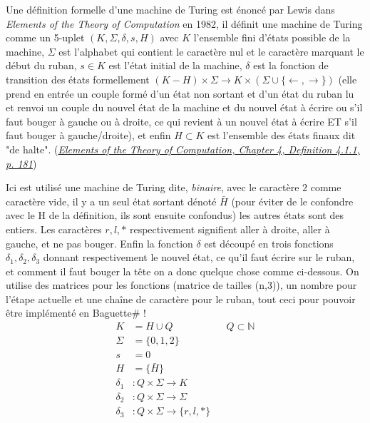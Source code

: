 \documentclass[11pt,colorlinks=true,a4paper]{article}
\newcommand{\bsf}{Baguette\# }
\begin{document}
        Une définition formelle d'une machine de Turing est énoncé par Lewis dans \textit{Elements of the Theory of Computation} en 1982, il définit une machine de Turing 
        comme un 5-uplet $(K,\Sigma,\delta,s,H)$ avec $K$ l'ensemble fini d'états possible de la machine, $\Sigma$ est l'alphabet qui contient 
        le caractère nul et le caractère marquant le début du ruban, $s \in K$ est l'état initial de la machine, $\delta$ est la fonction 
        de transition des états formellement $(K - H) \times \Sigma \to K \times (\Sigma \cup \{\leftarrow,\rightarrow\})$
        (elle prend en entrée un couple formé d'un état non sortant et d'un état du ruban lu et 
        renvoi un couple du nouvel état de la machine et du nouvel état à écrire ou s'il faut bouger à gauche ou à droite, ce qui 
        revient à un nouvel état à écrire ET s'il faut bouger à gauche/droite), et enfin $H \subset K$ est l'ensemble des états 
        finaux dit "de halte". (\href{https://www.awa2el.net/sites/default/files/nzry_hsbt_ltb_lthny.pdf}{\textit{Elements of the Theory of Computation, Chapter 4, Definition 4.1.1, p. 181}})\newline

        
        Ici est utilisé une machine de Turing dite, \textit{binaire}, avec le caractère $2$ comme caractère vide, 
        il y a un seul état sortant dénoté $\bar{H}$ (pour éviter de le confondre avec le H de la définition, ils sont ensuite confondus) 
        les autres états sont des entiers. 
        Les caractères $r,l,*$ respectivement signifient aller à droite, aller à gauche, et ne pas bouger.
        Enfin la fonction $\delta$ est découpé en trois fonctions $\delta_1,\delta_2,\delta_3$ donnant respectivement 
        le nouvel état, ce qu'il faut écrire sur le ruban, et comment il faut bouger la tête
         on a donc quelque chose comme ci-dessous. 
         On utilise des matrices pour les fonctions (matrice de tailles (n,3)), un nombre pour l'étape actuelle et une chaîne de caractère pour le ruban,
         tout ceci pour pouvoir être implémenté en \bsf!
        \begin{align*}
            K &= H \cup Q && Q \subset \mathbb{N} \\
            \Sigma &= \{0,1,2\} \\ 
            s &= 0 \\ 
            H &= \{\bar{H}\} \\ 
            \delta_1 &: Q \times \Sigma \to K \\ 
            \delta_2 &: Q \times \Sigma \to \Sigma \\ 
            \delta_3 &: Q \times \Sigma \to \{r,l,*\}
        \end{align*}
\end{document}

